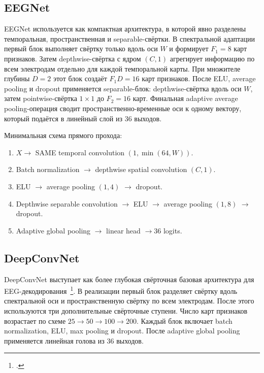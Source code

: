 \subsection*{EEGNet}

EEGNet используется как компактная архитектура, в которой явно разделены
темпоральная, пространственная и separable-свёртки. В спектральной адаптации
первый блок выполняет свёртку только вдоль оси $W$ и формирует $F_1=8$
карт признаков. Затем depthwise-свёртка с ядром $(C,1)$ агрегирует информацию
по всем электродам отдельно для каждой темпоральной карты. При множителе
глубины $D=2$ этот блок создаёт $F_1D=16$ карт признаков. После ELU,
average pooling и dropout применяется separable-блок: depthwise-свёртка
вдоль оси $W$, затем pointwise-свёртка $1\times1$ до $F_2=16$ карт.
Финальная adaptive average pooling-операция сводит пространственно-временные
оси к одному вектору, который подаётся в линейный слой из 36 выходов.

Минимальная схема прямого прохода:

\begin{enumerate}
  \item $X \rightarrow$ SAME temporal convolution $(1, \min(64,W))$.
  \item Batch normalization $\rightarrow$ depthwise spatial convolution $(C,1)$.
  \item ELU $\rightarrow$ average pooling $(1,4)$ $\rightarrow$ dropout.
  \item Depthwise separable convolution $\rightarrow$ ELU $\rightarrow$
  average pooling $(1,8)$ $\rightarrow$ dropout.
  \item Adaptive global pooling $\rightarrow$ linear head $\rightarrow 36$ logits.
\end{enumerate}

\subsection*{DeepConvNet}

DeepConvNet выступает как более глубокая свёрточная базовая архитектура для
EEG-декодирования~\footcite{10.1002/hbm.23730}. В реализации первый блок
разделяет свёртку вдоль спектральной оси и пространственную свёртку по всем
электродам. После этого используются три дополнительные свёрточные ступени.
Число карт признаков возрастает по схеме $25 \rightarrow 50 \rightarrow
100 \rightarrow 200$. Каждый блок включает batch normalization, ELU,
max pooling и dropout. После adaptive global pooling применяется линейная
голова из 36 выходов.

